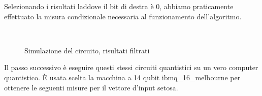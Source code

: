 Selezionando i risultati laddove il bit di destra è 0, abbiamo praticamente effettuato 
la misura condizionale necessaria al funzionamento dell'algoritmo. 

\begin{figure}[h]
    \myfloatalign
     \\
    \caption{Simulazione del circuito, risultati filtrati}
    \label{fig:simulazione_filtrati}
\end{figure}

Il passo successivo è eseguire questi stessi circuiti quantistici su un vero computer quantistico. 
È usata scelta la macchina a 14 qubit ibmq\_16\_melbourne per ottenere le seguenti misure per il vettore d'input 
setosa. 

